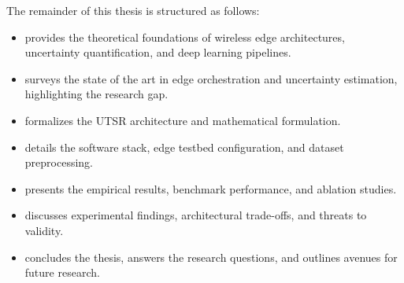 The remainder of this thesis is structured as follows:
\begin{itemize}
    \item {} provides the theoretical foundations of wireless edge architectures, uncertainty quantification, and deep learning pipelines.
    \item {} surveys the state of the art in edge orchestration and uncertainty estimation, highlighting the research gap.
    \item {} formalizes the \ac{UTSR} architecture and mathematical formulation.
    \item {} details the software stack, edge testbed configuration, and dataset preprocessing.
    \item {} presents the empirical results, benchmark performance, and ablation studies.
    \item {} discusses experimental findings, architectural trade-offs, and threats to validity.
    \item {} concludes the thesis, answers the research questions, and outlines avenues for future research.
\end{itemize}
